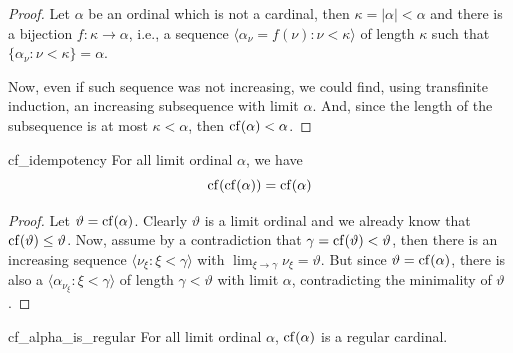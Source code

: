 \begin{proof}
    Let $\alpha$ be an ordinal which is not a cardinal, then $\kappa=\lvert\alpha\rvert<\alpha$ and there is a bijection $f:\kappa\to\alpha$, i.e., a sequence $\langle\alpha_\nu=f(\nu):\nu<\kappa\rangle$ of length $\kappa$ such that $\{\alpha_\nu:\nu<\kappa\}=\alpha$.

    Now, even if such sequence was not increasing, we could find, using transfinite induction, an increasing subsequence with limit $\alpha$. And, since the length of the subsequence is at most $\kappa<\alpha$, then $\mathrm{cf}\!\left(\alpha\right)<\alpha$.
\end{proof}

\begin{lemma}{}{cf_idempotency}
    For all limit ordinal $\alpha$, we have
    $$\mathrm{cf}\!\left(\mathrm{cf}\!\left(\alpha\right)\right)=\mathrm{cf}\!\left(\alpha\right)$$
\end{lemma}

\begin{proof}
    Let $\vartheta=\mathrm{cf}\!\left(\alpha\right)$. Clearly $\vartheta$ is a limit ordinal and we already know that $\mathrm{cf}\!\left(\vartheta\right)\leq\vartheta$. Now, assume by a contradiction that $\gamma=\mathrm{cf}\!\left(\vartheta\right)<\vartheta$, then there is an increasing sequence $\langle\nu_\xi:\xi<\gamma\rangle$ with $\lim_{\xi\to\gamma}\nu_\xi=\vartheta$. But since $\vartheta=\mathrm{cf}\!\left(\alpha\right)$, there is also a $\langle\alpha_{\nu_\xi}:\xi<\gamma\rangle$ of length $\gamma<\vartheta$ with limit $\alpha$, contradicting the minimality of $\vartheta$.
\end{proof}

\begin{corollary}{}{cf_alpha_is_regular}
    For all limit ordinal $\alpha$, $\mathrm{cf}\!\left(\alpha\right)$ is a regular cardinal.
\end{corollary}